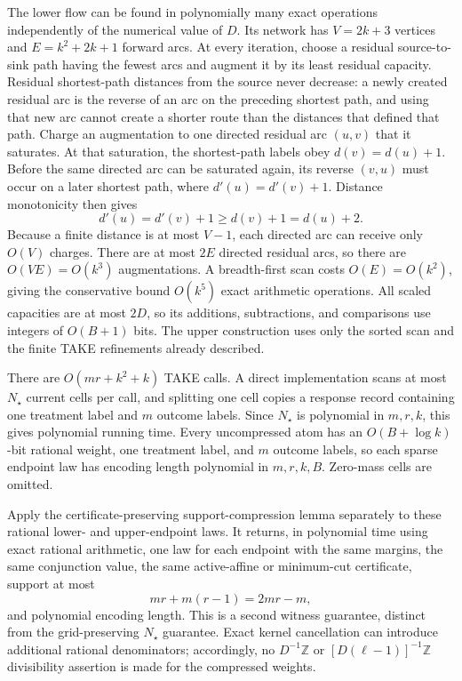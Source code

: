 The lower flow can be found in polynomially many exact operations independently of the numerical value of \(D\).  Its network has \(V=2k+3\) vertices and \(E=k^2+2k+1\) forward arcs.  At every iteration, choose a residual source-to-sink path having the fewest arcs and augment it by its least residual capacity.  Residual shortest-path distances from the source never decrease: a newly created residual arc is the reverse of an arc on the preceding shortest path, and using that new arc cannot create a shorter route than the distances that defined that path.  Charge an augmentation to one directed residual arc \((u,v)\) that it saturates.  At that saturation, the shortest-path labels obey \(d(v)=d(u)+1\).  Before the same directed arc can be saturated again, its reverse \((v,u)\) must occur on a later shortest path, where \(d'(u)=d'(v)+1\).  Distance monotonicity then gives
\[
d'(u)=d'(v)+1\geq d(v)+1=d(u)+2.
\]
Because a finite distance is at most \(V-1\), each directed arc can receive only \(O(V)\) charges.  There are at most \(2E\) directed residual arcs, so there are \(O(VE)=O(k^3)\) augmentations.  A breadth-first scan costs \(O(E)=O(k^2)\), giving the conservative bound \(O(k^5)\) exact arithmetic operations.  All scaled capacities are at most \(2D\), so its additions, subtractions, and comparisons use integers of \(O(B+1)\) bits.  The upper construction uses only the sorted scan and the finite TAKE refinements already described.

There are \(O(mr+k^2+k)\) TAKE calls.  A direct implementation scans at most \(N_\star\) current cells per call, and splitting one cell copies a response record containing one treatment label and \(m\) outcome labels.  Since \(N_\star\) is polynomial in \(m,r,k\), this gives polynomial running time.  Every uncompressed atom has an \(O(B+\log k)\)-bit rational weight, one treatment label, and \(m\) outcome labels, so each sparse endpoint law has encoding length polynomial in \(m,r,k,B\).  Zero-mass cells are omitted.

Apply the certificate-preserving support-compression lemma separately to these rational lower- and upper-endpoint laws.  It returns, in polynomial time using exact rational arithmetic, one law for each endpoint with the same margins, the same conjunction value, the same active-affine or minimum-cut certificate, support at most
\[
mr+m(r-1)=2mr-m,
\]
and polynomial encoding length.  This is a second witness guarantee, distinct from the grid-preserving \(N_\star\) guarantee.  Exact kernel cancellation can introduce additional rational denominators; accordingly, no \(D^{-1}\mathbb Z\) or \([D(\ell-1)]^{-1}\mathbb Z\) divisibility assertion is made for the compressed weights.

